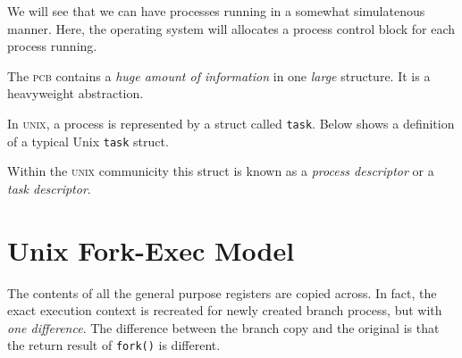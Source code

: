 We will see that we can have processes running in a somewhat simulatenous manner.
Here, the operating system will allocates 
a process control block for each process running. 


The \textsc{pcb} contains a \textit{huge amount of information} in
one \textit{large} structure. It is a heavyweight abstraction.


\begin{example}
In \textsc{unix}, a process is represented by a struct called \lstinline{task}. 
Below shows a definition of a typical Unix \lstinline{task} struct.  
\end{example}

Within the \textsc{unix} communicity this struct is known as a \textit{process descriptor}
or a \textit{task descriptor}.







\section{Unix Fork-Exec Model}



The contents of all the general purpose registers are copied across. 
In fact, the exact execution context is recreated for newly created branch process, 
but with \textit{one difference}. 
The difference between the branch copy and the original is
that the return result of \lstinline{fork()} is different.

\begin{figure}[h]
\end{figure}

